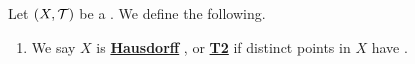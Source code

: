 \newcommand{\Hausdorff}[0]{
    \textbf{\hyperref[def:Hausdorff]{Hausdorff}}
}
\newcommand{\Hausdorffness}[0]{
    \textbf{\hyperref[def:Hausdorff]{Hausdorffness}}
}
\newcommand{\TTwo}[0]{
    \textbf{\hyperref[def:Hausdorff]{T2}}
}
\begin{df}
    \label{def:SeparationAxioms}
    Let $(X,\mathcal{T})$ be a \TopologicalSpace. 
    We define the following. 
    \begin{enumerate}[label=(\roman*), ref={\ref{def:SeparationAxioms}~\roman*}]
    \item \label{def:Hausdorff} We say $X$ is \Hausdorff, or \TTwo if 
    distinct points in $X$ have \Disjoint \Neighborhoods.
    \end{enumerate}
\end{df}

